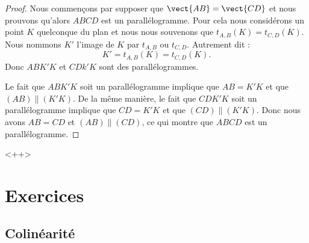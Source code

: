 \begin{proof}
    Nous commençons par supposer que \( \vect{ AB }=\vect{ CD }\) et nous prouvons qu'alors \( ABCD\) est un parallélogramme. Pour cela nous considérons un point \( K\) quelconque du plan et nous nous souvenons que \( t_{A,B}(K)=t_{C,D}(K)\). Nous nommons \( K'\) l'image de \( K\) par \( t_{A,B}\) ou \( t_{C,D}\). Autrement dit :
    \begin{equation}
        K'=t_{A,B}(K)=t_{C,D}(K).
    \end{equation}
    Donc \( ABK'K\) et \( CDk'K\) sont des parallélogrammes.

    Le fait que \( ABK'K\) soit un parallélogramme implique que \( AB=K'K\) et que \( (AB)\parallel(K'K)\). De la même manière, le fait que \( CDK'K\) soit un parallélogramme implique que \( CD=K'K\) et que \( (CD)\parallel(K'K)\). Donc nous avons \( AB=CD\) et \( (AB)\parallel(CD)\), ce qui montre que \( ABCD\) est un parallélogramme.
\end{proof}
<++>

\section{Exercices}


\subsection{Colinéarité}

